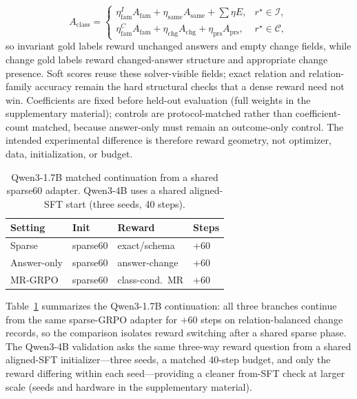 \documentclass[letterpaper]{article}
\newcommand{\method}{MR-GRPO}
\begin{document}
\begin{equation}
A_{\mathrm{class}}=
\begin{cases}
\eta^{I}_{\mathrm{fam}}A_{\mathrm{fam}}+\eta_{\mathrm{same}}A_{\mathrm{same}}+\sum \eta E, & r^\star\in\mathcal{I},\\
\eta^{C}_{\mathrm{fam}}A_{\mathrm{fam}}+\eta_{\mathrm{chg}}A_{\mathrm{chg}}+\eta_{\mathrm{prs}}A_{\mathrm{prs}}, & r^\star\in\mathcal{C},
\end{cases}
\end{equation}
so invariant gold labels reward unchanged answers and empty change fields, while change gold labels reward changed-answer structure and appropriate change presence. Soft scores reuse these solver-visible fields; exact relation and relation-family accuracy remain the hard structural checks that a dense reward need not win. Coefficients are fixed before held-out evaluation (full weights in the supplementary material); controls are protocol-matched rather than coefficient-count matched, because answer-only must remain an outcome-only control. The intended experimental difference is therefore reward geometry, not optimizer, data, initialization, or budget.

\begin{table}[t]
\centering
\small
\begin{tabular}{llll}
\toprule
Setting & Init & Reward & Steps \\
\midrule
Sparse & sparse60 & exact/schema & +60 \\
Answer-only & sparse60 & answer-change & +60 \\
\method{} & sparse60 & class-cond.\ MR & +60 \\
\bottomrule
\end{tabular}
\caption{Qwen3-1.7B matched continuation from a shared sparse60 adapter. Qwen3-4B uses a shared aligned-SFT start (three seeds, 40 steps).}
\label{tab:match}
\end{table}

Table~\ref{tab:match} summarizes the Qwen3-1.7B continuation: all three branches continue from the same sparse-GRPO adapter for $+60$ steps on relation-balanced change records, so the comparison isolates reward switching after a shared sparse phase. The Qwen3-4B validation \cite{yang2025qwen3} asks the same three-way reward question from a shared aligned-SFT initializer---three seeds, a matched 40-step budget, and only the reward differing within each seed---providing a cleaner from-SFT check at larger scale (seeds and hardware in the supplementary material).
\end{document}

